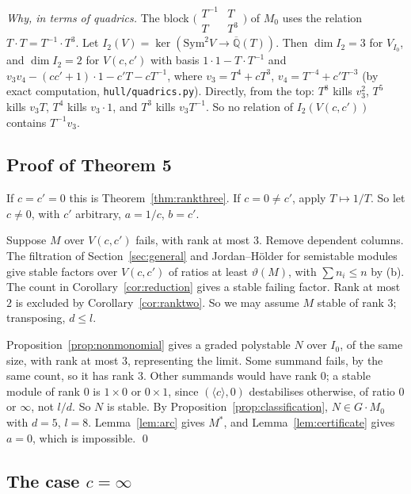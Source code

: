 \documentclass[11pt,a4paper]{article}
\theoremstyle{plain}
\theoremstyle{definition}
\newcommand{\Qbar}{\overline{\mathbb{Q}}}
\newcommand{\vth}{\vartheta}
\newcommand{\Iz}{I_{0}}
\newcommand{\scr}[1]{\nolinkurl{#1}}
\begin{document}
\emph{Why, in terms of quadrics.} The block $\bigl(\begin{smallmatrix}T^{-1}&T\\T&T^{3}\end{smallmatrix}\bigr)$ of $M_{0}$ uses the relation $T\cdot T=T^{-1}\cdot T^{3}$. Let $I_{2}(V)=\ker(\mathrm{Sym}^{2}V\to\Qbar(T))$. Then $\dim I_{2}=3$ for $V_{\Iz}$, and $\dim I_{2}=2$ for $V(c,c')$ with basis $1\cdot1-T\cdot T^{-1}$ and $v_{3}v_{4}-(cc'+1)\cdot1-c'T-cT^{-1}$, where $v_{3}=T^{4}+cT^{3}$, $v_{4}=T^{-4}+c'T^{-3}$ (by exact computation, \scr{hull/quadrics.py}). Directly, from the top: $T^{8}$ kills $v_{3}^{2}$, $T^{5}$ kills $v_{3}T$, $T^{4}$ kills $v_{3}\cdot1$, and $T^{3}$ kills $v_{3}T^{-1}$. So no relation of $I_{2}(V(c,c'))$ contains $T^{-1}v_{3}$.

\subsection{Proof of Theorem 5}

If $c=c'=0$ this is Theorem~\ref{thm:rankthree}. If $c=0\neq c'$, apply $T\mapsto1/T$. So let $c\neq0$, with $c'$ arbitrary, $a=1/c$, $b=c'$.

Suppose $M$ over $V(c,c')$ fails, with rank at most $3$. Remove dependent columns. The filtration of Section~\ref{sec:general} and Jordan--H\"older for semistable modules give stable factors over $V(c,c')$ of ratios at least $\vth(M)$, with $\sum n_{i}\le n$ by (b). The count in Corollary~\ref{cor:reduction} gives a stable failing factor. Rank at most $2$ is excluded by Corollary~\ref{cor:ranktwo}. So we may assume $M$ stable of rank $3$; transposing, $d\le l$.

Proposition~\ref{prop:nonmonomial} gives a graded polystable $N$ over $\Iz$, of the same size, with rank at most $3$, representing the limit. Some summand fails, by the same count, so it has rank $3$. Other summands would have rank $0$; a stable module of rank $0$ is $1\times0$ or $0\times1$, since $(\langle c\rangle,0)$ destabilises otherwise, of ratio $0$ or $\infty$, not $l/d$. So $N$ is stable. By Proposition~\ref{prop:classification}, $N\in G\cdot M_{0}$ with $d=5$, $l=8$. Lemma~\ref{lem:arc} gives $M^{*}$, and Lemma~\ref{lem:certificate} gives $a=0$, which is impossible. \qed

\subsection{The case $c=\infty$}\label{sec:cinfinity}
\end{document}
